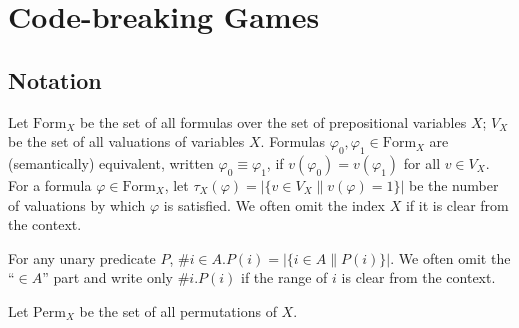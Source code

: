 \chapter{Code-breaking Games}

\newcommand{\Val}{V} %
\newcommand{\val}{v} %
\newcommand{\numval}{\tau} %
\renewcommand{\Form}{\textrm{Form}} %
\newcommand{\form}{\varphi} %
\newcommand{\aform}[1]{\form_{0..#1}} %

\newcommand{\game}{\mathcal{G}}
\newcommand{\Var}{X}
\newcommand{\init}{\varphi_0}
\newcommand{\Expt}{T}
\newcommand{\expt}{t}
\newcommand{\Exp}{E}
\renewcommand{\exp}{e}
\newcommand{\param}{p}
\newcommand{\infer}{\Phi}

\newcommand{\Perm}{\textrm{Perm}}
\newcommand{\perm}{\pi}
\newcommand{\result}{\rho}

\newcommand{\stg}{\sigma}

\newcommand{\proc}{\pi}
\newcommand{\procstg}[2]{\proc_{#1,#2}}

\newcommand{\len}{\lambda}
\newcommand{\lenstg}[2]{\len^{#1,#2}}
\newcommand{\lenmax}[1]{\len^{#1}}
\newcommand{\lenexp}[1]{\len^{#1}_\textrm{exp}}

\newcommand{\exactly}[1]{\textrm{Exactly-#1}\:}
\newcommand{\atleast}[1]{\textrm{AtLeast-#1}\:}
\newcommand{\atmost}[1]{\textrm{AtMost-#1}\:}

\section[0]{Notation}
Let $\Form_\Var$ be the set of all formulas over the set of prepositional variables $\Var$;
$\Val_\Var$ be the set of all valuations of variables $\Var$.
Formulas $\form_0, \form_1 \in \Form_\Var$ are (semantically) equivalent,
  written $\form_0 \equiv \form_1$, if
  $\val(\form_0) = \val(\form_1)$ for all $\val\in\Val_\Var$.
For a formula $\form\in\Form_\Var$, let
  $\numval_\Var(\form) = |\{ \val\in\Val_\Var \| \val(\form) = 1 \}|$
  be the number of valuations by which $\form$ is satisfied.
We often omit the index $\Var$ if it is clear from the context.

For any unary predicate $P$, $\#i\in A.P(i) = |\{ i\in A \| P(i)\}|$.
  We often omit the ``$\in A$'' part and write only $\#i.P(i)$
  if the range of $i$ is clear from the context.

Let $\Perm_\Var$ be the set of all permutations of $\Var$.


